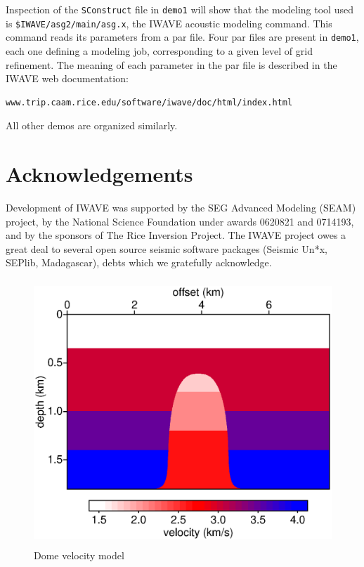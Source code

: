 \documentclass [12pt]{georeport}
\begin{document}
Inspection of the {\tt SConstruct} file in {\tt demo1} will show that
the modeling tool used is {\tt \$IWAVE/asg2/main/asg.x}, the IWAVE
acoustic modeling command. This command reads its parameters from a
par file. Four par files are present in {\tt demo1}, each one defining
a modeling job, corresponding to a given level of grid refinement. The
meaning of each parameter in the par file is described in the IWAVE
web documentation:
\begin{verbatim}
www.trip.caam.rice.edu/software/iwave/doc/html/index.html
\end{verbatim}
All other demos are organized similarly.

\section{Acknowledgements}
Development of IWAVE was supported by the SEG Advanced Modeling (SEAM) project, by the National Science Foundation under awards 0620821 and 0714193, and by the sponsors of The Rice Inversion Project. The IWAVE project owes a great deal to several open source seismic software packages (Seismic Un*x, SEPlib, Madagascar), debts which we gratefully acknowledge. 



\newpage

\begin{figure}
\label{fig1}
\includegraphics[height=10cm,width=15cm]{./Fig/fig1.ps}
\caption{Dome velocity model}
\end{figure}
\end{document}
